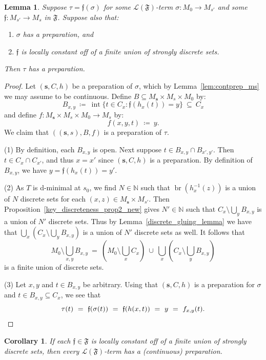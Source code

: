 \documentclass[11pt]{amsart}
\theoremstyle{plain}
\newtheorem{lemma}[thm]{Lemma}
\newtheorem{cor}[thm]{Corollary}
\theoremstyle{definition}
\numberwithin{equation}{section}
\newcommand{\fr}{\mathfrak}
\newcommand\N{\mathbb{N}}
\newcommand\calL{\mathcal{L}}
\newcommand\0{\varnothing}
\begin{document}
\begin{lemma}
Suppose $\tau =\fr{f}(\sigma)$ for some $\calL(\fr{F})$-term $\sigma\colon M_0\to M_{s'}$ and some $\fr{f}\colon M_{s'}\to M_{s}$ in $\fr{F}$. Suppose also that:
\begin{enumerate}
\item $\sigma$ has a preparation, and
\item $\fr{f}$  is locally constant off of a finite union of strongly discrete sets.
\end{enumerate}
Then $\tau$ has a preparation.
\end{lemma}
\begin{proof}
Let $(\bm{s},C,h)$ be a preparation of $\sigma$, which by Lemma~\ref{lem:contprep_ms} we may assume to be continuous. Define $B\subseteq M_{\bm{s}}\times M_{s}\times M_0$ by:
\[
B_{x,y} \ \coloneqq  \ \operatorname{int}\{t\in C_x:\fr{f}(h_x(t))=y\} \ \subseteq \ C_x
\]
and define $f\colon M_{\bm{s}}\times M_{s}\times M_0\to M_{s}$ by:
\[
f(x,y,t) \ \coloneqq  \ y.
\]
We claim that $((\bm{s},s),B,f)$ is a preparation of $\tau$.

(1) By definition, each $B_{x,y}$ is open. Next suppose $t\in B_{x,y}\cap B_{x',y'}$. Then $t\in C_x\cap C_{x'}$, and thus $x=x'$ since $(\bm{s},C,h)$ is a preparation. By definition of $B_{x,y}$, we have $y = \fr{f}(h_x(t)) = y'$. 

(2) As $T$ is d-minimal at $s_0$, we find $N \in \N$ such that $\operatorname{br}(h_x^{-1}(z))$ is a union of $N$ discrete sets for each $(x,z)\in M_{\bm{s}}\times M_{s'}$. Then Proposition~\ref{key_discreteness_prop2_new} gives $N' \in \N$ such that $C_x\setminus\bigcup_yB_{x,y}$ is a union of $N'$ discrete sets. Thus by Lemma~\ref{discrete_gluing_lemma} we have that $\bigcup_x(C_x\setminus \bigcup_yB_{x,y})$ is a union of $N'$ discrete sets as well. It follows that
\[
\textstyle M_0\setminus\bigcup_{x,y}B_{x,y} \ = \ (M_0\setminus\bigcup_{x}C_x) \ \cup \ \bigcup_x(C_x\setminus \bigcup_yB_{x,y})
\]
is a finite union of discrete sets.

(3) Let $x,y$ and $t\in B_{x,y}$ be arbitrary. Using that $(\bm{s},C,h)$ is a preparation for $\sigma$ and $t\in B_{x,y} \subseteq C_x$, we see that
\[
\tau(t) \ = \ \fr{f}(\sigma(t)) \ =\ \fr{f}(h(x,t))\ = \ y \ = \ f_{x,y}(t).\qedhere
\]
\end{proof}

\begin{cor}\label{all_terms_preps_ms}
If each $\fr{f}\in\fr{F}$  is locally constant off of a finite union of strongly discrete sets, then every $\calL(\fr{F})$-term has a (continuous) preparation.
\end{cor}
\end{document}

